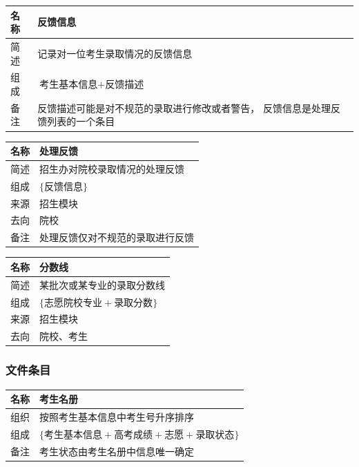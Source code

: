 \documentclass[CJK,utf8]{ctexrep}
\begin{document}
\begin{tabularx}{0.85\textwidth}{|l|X|}
	\hline
	\textbf{名称} & \textbf{反馈信息} \\
	\hline
	简述 & 记录对一位考生录取情况的反馈信息 \\
	\hline
	组成 & $\text{考生基本信息}+\text{反馈描述}$ \\
	\hline
	\multirow{2}{*}{备注} & 反馈描述可能是对不规范的录取进行修改或者警告，
	反馈信息是处理反馈列表的一个条目 \\
	\hline
\end{tabularx}

\begin{tabularx}{0.85\textwidth}{|l|X|}
	\hline
	\textbf{名称} & \textbf{处理反馈} \\
	\hline
	简述 & 招生办对院校录取情况的处理反馈 \\
	\hline
	组成 & $\lbrace\text{反馈信息}\rbrace$ \\
	\hline
	来源 & 招生模块 \\
	\hline
	去向 & 院校 \\
	\hline
	备注 & 处理反馈仅对不规范的录取进行反馈 \\
	\hline
\end{tabularx}

\begin{tabularx}{0.85\textwidth}{|l|X|}
	\hline
	\textbf{名称} & \textbf{分数线} \\
	\hline
	简述 & 某批次或某专业的录取分数线 \\
	\hline
	组成 & $\lbrace\text{志愿院校专业}+\text{录取分数}\rbrace$ \\
	\hline
	来源 & 招生模块 \\
	\hline
	去向 & 院校、考生 \\
	\hline
\end{tabularx}

\subsubsection*{文件条目}

\begin{tabularx}{0.85\textwidth}{|l|X|}
	\hline
	\textbf{名称} & \textbf{考生名册} \\
	\hline
	组织 & 按照考生基本信息中考生号升序排序 \\
	\hline
	组成 & $\lbrace\text{考生基本信息}+\text{高考成绩}+\text{志愿}
	+\text{录取状态}\rbrace$ \\
	\hline
	备注 & 考生状态由考生名册中信息唯一确定 \\
	\hline
\end{tabularx}
\end{document}
